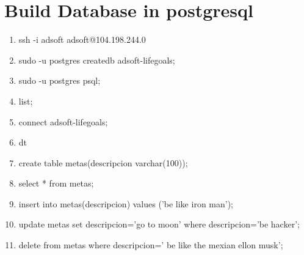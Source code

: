 \documentclass[10pt]{article}         %
\begin{document}
\section{Build Database in postgresql}

\begin{enumerate}

	\item
	   ssh -i adsoft adsoft@104.198.244.0
	\item
	   sudo -u postgres createdb adsoft-lifegoals;
	\item
	   sudo -u postgres psql;	
    \item 
       list;	   
	\item
	   connect adsoft-lifegoals;
	\item
	   dt
	\item
	   create table metas(descripcion varchar(100));
	\item
	   select * from metas;
	\item
	   insert into metas(descripcion) values ('be like iron man');
	\item
	   update metas set descripcion='go to moon' where descripcion='be hacker';
	\item
	   delete from metas where descripcion=' be like the mexian ellon musk';

	 
	        
   
    	
\end{enumerate}
\end{document}
